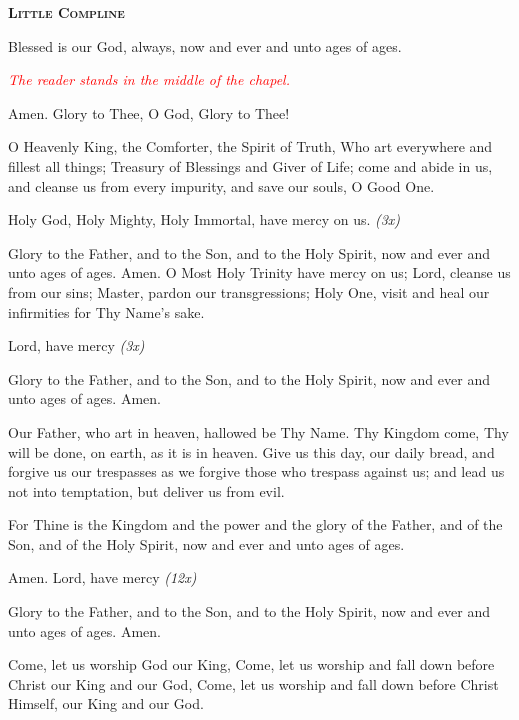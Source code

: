 \documentclass[paper=a6,fontsize=2.3mm]{scrartcl}
\begin{document}
\begin{center}
\textsc{\textbf{Little Compline}}
\end{center}

\hangindent=10mm
\noindent{}Blessed is our God, always, now and ever and 
unto ages of ages.

\noindent
\textcolor{red}{\textit{The reader stands in the middle of the chapel.}}

\noindent{}
\begin{minipage}[t]{\dimexpr \textwidth-10mm}
Amen.  Glory to Thee, O God, Glory to Thee!

O Heavenly King, the Comforter, the Spirit of Truth, Who art everywhere and fillest all things; Treasury of Blessings and Giver of Life; come and abide in us, and cleanse us from every impurity, and save our souls, O Good One.

Holy God, Holy Mighty, Holy Immortal, have mercy on us. \textit{(3x)}

Glory to the Father, and to the Son, and to the Holy Spirit, now and ever and unto ages of ages. Amen.
O Most Holy Trinity have mercy on us; Lord, cleanse us from our sins; Master, pardon our transgressions; Holy One, visit and heal our infirmities for Thy Name's sake.

Lord, have mercy \textit{(3x)}

Glory to the Father, and to the Son, and to the Holy Spirit, now and ever and unto ages of ages. Amen.
\end{minipage}

\noindent{}
\begin{minipage}[t]{\dimexpr \textwidth-10mm}
Our Father, who art in heaven, hallowed be Thy Name.  Thy Kingdom come, Thy will be done, on earth, as it is in heaven.  Give us this day, our daily bread, and forgive us our trespasses as we forgive those who trespass against us; and lead us not into temptation, but deliver us from evil.
\end{minipage}

\noindent{}
\begin{minipage}[t]{\dimexpr \textwidth-10mm}
For Thine is the Kingdom and the power and the glory of the Father, and of the Son, and of the Holy Spirit, now and ever and unto ages of ages.
\end{minipage}

\noindent{}
\begin{minipage}[t]{\dimexpr \textwidth-10mm}
Amen.  Lord, have mercy \textit{(12x)}

Glory to the Father, and to the Son, and to the Holy Spirit, now and ever and unto ages of ages. Amen.

Come, let us worship God our King, Come, let us worship and fall down before Christ our King and our God, Come, let us worship and fall down before Christ Himself, our King and our God.
\end{minipage}
\end{document}
